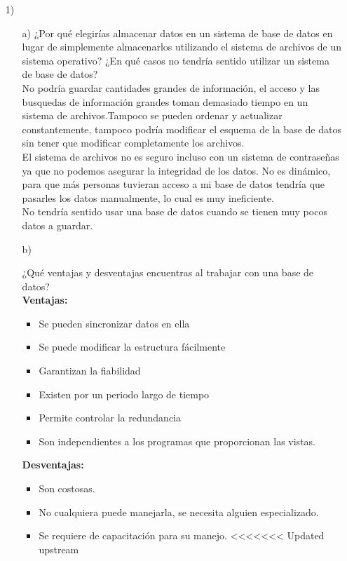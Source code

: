 \documentclass[a4paper, 12pt]{report}
\begin{document}
\begin{enumerate}
\item[1)]{
\begin{enumerate}
    \item[a)]{¿Por qué elegirías almacenar datos en un sistema de base
	 de datos en lugar de simplemente almacenarlos utilizando el
	 sistema de archivos de un sistema operativo? ¿En qué casos no
	 tendría sentido utilizar un sistema de base de datos?\\

	 No podría guardar cantidades grandes de información, el acceso
	 y las busquedas de información grandes	toman demasiado tiempo
	 en un sistema de archivos.Tampoco se pueden ordenar y actualizar
	 constantemente, tampoco podría modificar el esquema de la base
	 de datos sin tener que modificar completamente los archivos.\\
	 El sistema de archivos no es seguro incluso con un sistema
	 de contraseñas ya que no podemos asegurar la integridad de los
	 datos. No es dinámico, para que más personas tuvieran acceso a
	 mi base de datos tendría que pasarles los datos manualmente, lo cual es muy ineficiente.\\
	 No tendría sentido usar una base de datos cuando se tienen muy
	 pocos datos a guardar.}
    \item[b)]{¿Qué ventajas y desventajas encuentras al trabajar con una
	 base de datos?\\
	 \textbf{Ventajas:}
	 \begin{itemize}
	 	\item Se pueden sincronizar datos en ella
	 	\item Se puede modificar la estructura fácilmente
	 	\item Garantizan la fiabilidad
	 	\item Existen por un periodo largo de tiempo
	 	\item Permite controlar la redundancia
	 	\item Son independientes a los programas que proporcionan las
	 	vistas.
	 \end{itemize}
 	 \textbf{Desventajas:}
 	 \begin{itemize}
 	 	\item Son costosas.
 	 	\item No cualquiera puede manejarla, se necesita alguien
 	 	especializado.
 	 	\item Se requiere de capacitación para su manejo.
<<<<<<< Updated upstream
 	 \end{itemize} }
 	 

\end{enumerate}}
\end{enumerate}
\end{document}

